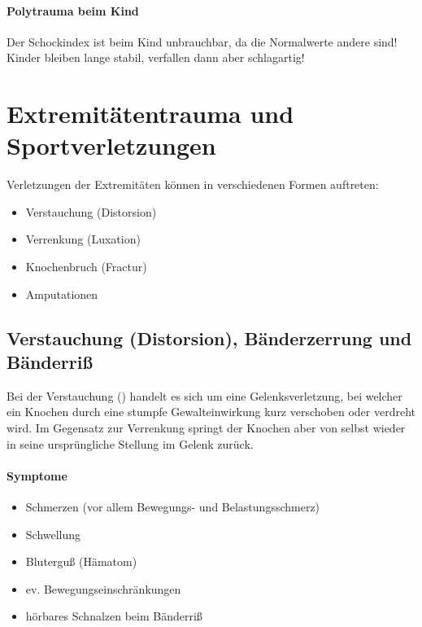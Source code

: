 \paragraph{Polytrauma beim Kind} Der Schockindex ist beim Kind unbrauchbar, da die
Normalwerte andere sind! Kinder bleiben lange stabil, verfallen dann aber schlagartig!



\section{Extremit\"atentrauma und Sportverletzungen}
Verletzungen der Extremitäten können in verschiedenen Formen auftreten:
\begin{itemize}
	\item Verstauchung (Distorsion)
	\item Verrenkung (Luxation)
	\item Knochenbruch (Fractur)
	\item Amputationen
\end{itemize}

\subsection{Verstauchung (Distorsion), Bänderzerrung und Bänderriß}

Bei der Verstauchung () handelt es sich um eine Gelenksverletzung, bei welcher ein Knochen durch eine stumpfe Gewalteinwirkung kurz verschoben oder verdreht wird. Im Gegensatz zur Verrenkung springt der Knochen aber von selbst wieder in seine ursprüngliche Stellung im Gelenk zurück.

\paragraph{Symptome}
\begin{itemize}
    \item Schmerzen (vor allem Bewegungs- und Belastungsschmerz)
    \item Schwellung
    \item Blutergu{\ss} (H\"amatom)
    \item ev. Bewegungseinschränkungen
    \item hörbares Schnalzen beim Bänderriß
\end{itemize}

